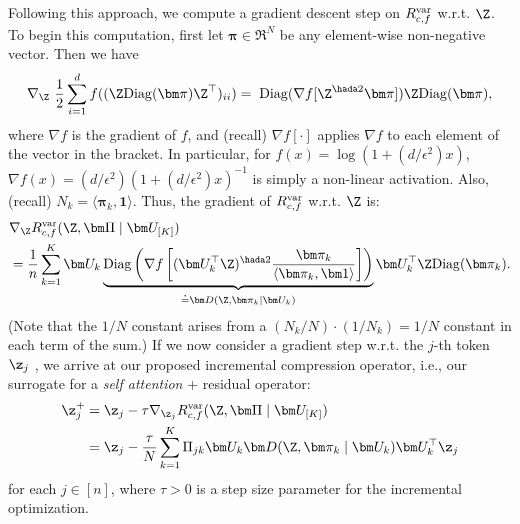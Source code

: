 \documentclass[../../book-main.tex]{subfiles}
\begin{document}
Following this approach, we compute a gradient descent step on
$R_{c,f}^{\rm var}$ w.r.t. $\Z$.
To begin this computation, first let $\bm \pi \in \Re^N$ be any
element-wise non-negative vector. Then we have
\begin{equation}\label{eq1:grad Rcf}
    \nabla_{\Z} \ \frac{1}{2} \sum_{i = 1}^{d} f(  (\Z
    \mathrm{Diag}(\bm \pi) \Z^{\top} )_{ii}) %
    = \; \mathrm{Diag}(\nabla f[ \Z^{\hada 2} \bm \pi] ) \Z
    \mathrm{Diag}(\bm \pi),
\end{equation}
where $\nabla f$ is the gradient of $f$, and (recall) $\nabla
f[\cdot]$ applies $\nabla f$ to each element of the vector in the
bracket. In particular, for $ f(x) = \log(1 + (d/\epsilon^{2}) x)$,
$\nabla f(x) = (d / \epsilon^{2}) (1+ (d / \epsilon^{2}) x)^{-1}$ is
simply a non-linear activation. Also, (recall) $N_{k} = \langle \bm
\pi_{k}, \bm 1\rangle$. Thus, the gradient of $R^{\rm var}_{c,f}$
w.r.t. $\Z$ is:
\begin{align}\label{eq2:grad Rcf}
    &\nabla_{\Z} R^{\rm var}_{c,f}(\Z,\bm \Pi \mid \bm
    U_{[K]}) \\
    &=
    \frac{1}{n}
    \sum_{k=1}^K \bm U_{k} \underbrace{\mathrm{Diag} \left(
            \nabla f\left[ (\bm
                U_{k}^{\top} \Z)^{\hada 2}  \frac{\bm \pi_k}{\langle
                    \bm \pi_{k},
    \bm 1\rangle} \right] \right)}_{\doteq \bm D(\Z, \bm \pi_{k} \mid
    \bm U_{k})} \bm U_{k}^{\top} \Z \mathrm{Diag}(\bm \pi_k).
\end{align}
(Note that the $1/N$ constant arises from a $(N_{k}/N)\cdot (1/N_{k})
= 1/N$ constant in each term of the sum.) If we now consider a
gradient step w.r.t. the $j$-th token $\z_j$
, we arrive at our proposed incremental compression operator, i.e.,
our surrogate for a \textit{self attention} + residual operator:
\begin{align}\label{eq:layer-operation-orig}
    \z_j^+
    &= \z_{j} - \tau \nabla_{\z_{j}}R_{c, f}^{\rm var}(\Z, \bm
    \Pi \mid \bm U_{[K]}) \\
    &= \z_j - \frac{\tau}{N} \sum_{k=1}^K
    \Pi_{jk} \bm U_{k} \bm D(\Z, \bm \pi_{k} \mid \bm U_{k}) \bm
    U_{k}^{\top} \z_j
\end{align}
for each \(j \in [n]\), where $\tau > 0$ is a step size parameter for
the incremental optimization.
\end{document}
